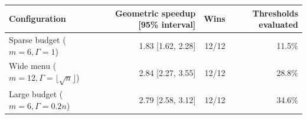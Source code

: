 \begin{tabular}{lrrr}
\toprule
Configuration & Geometric speedup [95\% interval] & Wins & Thresholds evaluated \\
\midrule
Sparse budget ($m=6,\Gamma=1$) & 1.83 [1.62, 2.28] & 12/12 & 11.5\% \\
Wide menu ($m=12,\Gamma=\lfloor\sqrt n\rfloor$) & 2.84 [2.27, 3.55] & 12/12 & 28.8\% \\
Large budget ($m=6,\Gamma=0.2n$) & 2.79 [2.58, 3.12] & 12/12 & 34.6\% \\
\bottomrule
\end{tabular}
